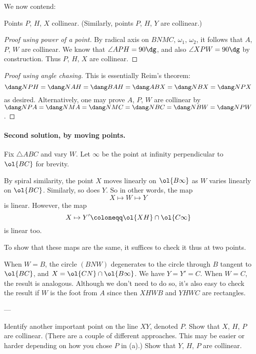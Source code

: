 We now contend:
\begin{claim*}
  Points $P$, $H$, $X$ collinear.
  (Similarly, points $P$, $H$, $Y$ are collinear.)
\end{claim*}
\begin{proof}
  [Proof using power of a point]
  By radical axis on $BNMC$, $\omega_1$, $\omega_2$,
  it follows that $A$, $P$, $W$ are collinear.
  We know that $\angle APH = 90\dg$, and also
  $\angle XPW = 90\dg$ by construction.
  Thus $P$, $H$, $X$ are collinear.
\end{proof}
\begin{proof}
  [Proof using angle chasing]
  This is essentially Reim's theorem:
  \[ \dang NPH = \dang NAH = \dang BAH = \dang ABX = \dang NBX = \dang NPX \]
  as desired.
  Alternatively, one may prove $A$, $P$, $W$ are collinear by
  $\dang NPA = \dang NMA = \dang NMC = \dang NBC = \dang NBW = \dang NPW$.
\end{proof}

\paragraph{Second solution, by moving points.}
Fix $\triangle ABC$ and vary $W$.
Let $\infty$ be the point at infinity perpendicular to $\ol{BC}$
for brevity.

By spiral similarity, the point $X$ moves linearly on $\ol{B\infty}$
as $W$ varies linearly on $\ol{BC}$.
Similarly, so does $Y$.
So in other words, the map \[ X \mapsto W \mapsto Y \]
is linear.
However, the map \[ X \mapsto Y' \coloneqq \ol{XH} \cap \ol{C\infty} \]
is linear too.

To show that these maps are the same,
it suffices to check it thus at two points.
\begin{itemize}
  \ii When $W = B$, the circle $(BNW)$
  degenerates to the circle through $B$ tangent to $\ol{BC}$,
  and $X = \ol{CN} \cap \ol{B\infty}$.
  We have $Y = Y' = C$.
  \ii When $W = C$, the result is analogous.
  \ii Although we don't need to do so,
  it's also easy to check the result if $W$
  is the foot from $A$
  since then $XHWB$ and $YHWC$ are rectangles.
\end{itemize}

---

\begin{walk}
  \ii Identify another important point on the line $XY$, denoted $P$.
  \ii Show that $X$, $H$, $P$ are collinear.
  (There are a couple of different approaches.
  This may be easier or harder depending on how you chose $P$ in (a).)
  \ii Show that $Y$, $H$, $P$ are collinear.
\end{walk}
